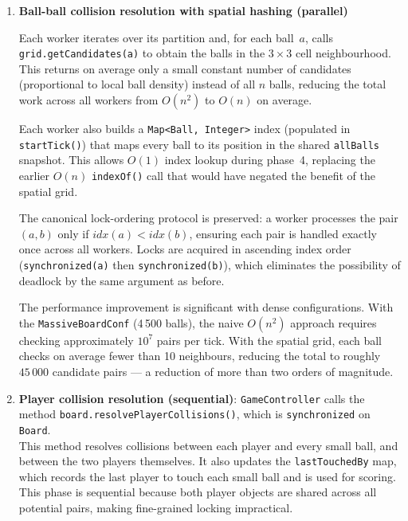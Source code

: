 \documentclass[12pt,a4paper]{article}
\begin{document}
\begin{enumerate}
The two \texttt{CyclicBarrier} instances are each constructed with $\mathit{parties} = N + 1$ (one per worker plus the \texttt{UpdateThread}). The \texttt{ReusableLatch} has no party count — it is opened by exactly one thread and awaited by all others independently.
 
	\item \textbf{Ball-ball collision resolution with spatial hashing (parallel)}
 
Each worker iterates over its partition and, for each ball~$a$, calls
\texttt{grid.getCandidates(a)} to obtain the balls in the $3 \times 3$ cell
neighbourhood. This returns on average only a small constant number of candidates
(proportional to local ball density) instead of all $n$ balls, reducing the total
work across all workers from $O(n^2)$ to $O(n)$ on average.
 
Each worker also builds a \texttt{Map<Ball, Integer>} index (populated in
\texttt{startTick()}) that maps every ball to its position in the shared
\texttt{allBalls} snapshot. This allows $O(1)$ index lookup during phase~4,
replacing the earlier $O(n)$ \texttt{indexOf()} call that would have negated the
benefit of the spatial grid.
 
The canonical lock-ordering protocol is preserved: a worker processes the pair
$(a, b)$ only if $\mathit{idx}(a) < \mathit{idx}(b)$, ensuring each pair is
handled exactly once across all workers. Locks are acquired in ascending index
order (\texttt{synchronized(a)} then \texttt{synchronized(b)}), which eliminates
the possibility of deadlock by the same argument as before.
 
The performance improvement is significant with dense configurations. With the
\texttt{MassiveBoardConf} (4\,500 balls), the naive $O(n^2)$ approach requires
checking approximately $10^7$ pairs per tick. With the spatial grid, each ball
checks on average fewer than 10 neighbours, reducing the total to roughly
$45\,000$ candidate pairs — a reduction of more than two orders of magnitude.
 
	\item \textbf{Player collision resolution (sequential)}: \texttt{GameController} calls the method
\texttt{board.resolvePlayerCollisions()}, which is \texttt{synchronized} on \texttt{Board}.\\
This method resolves collisions between each player and every small ball, and between the two players themselves. It also updates the \texttt{lastTouchedBy} map, which records the last player to touch each small ball and is used for scoring. This phase is sequential because both player objects are shared across all potential pairs, making fine-grained locking impractical.
 

\end{enumerate}
\end{document}
